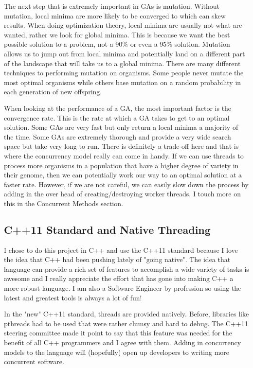 \documentclass{acm_proc_article-sp}
\begin{document}
The next step that is extremely important in GAs is mutation. Without mutation, local minima are more likely to be converged to which can skew results. When doing optimization theory, local minima are usually not what are wanted, rather we look for global minima. This is because we want the best possible solution to a problem, not a 90\% or even a 95\% solution. Mutation allows us to jump out from local minima and potentially land on a different part of the landscape that will take us to a global minima. There are many different techniques to performing mutation on organisms. Some people never mutate the most optimal organisms while others base mutation on a random probability in each generation of new offspring.

When looking at the performance of a GA, the most important factor is the convergence rate. This is the rate at which a GA takes to get to an optimal solution. Some GAs are very fast but only return a local minima a majority of the time. Some GAs are extremely thorough and provide a very wide search space but take very long to run. There is definitely a trade-off here and that is where the concurrency model really can come in handy. If we can use threads to process more organisms in a population that have a higher degree of variety in their genome, then we can potentially work our way to an optimal solution at a faster rate. However, if we are not careful, we can easily slow down the process by adding in the over head of creating/destroying worker threads. I touch more on this in the Concurrent Methods section.


\subsection{C++11 Standard and Native Threading}

I chose to do this project in C++ and use the C++11 standard because I love the idea that C++ had been pushing lately of "going native". The idea that language can provide a rich set of features to accomplish a wide variety of tasks is awesome and I really appreciate the effort that has gone into making C++ a more robust language. I am also a Software Engineer by profession so using the latest and greatest tools is always a lot of fun!

In the "new" C++11 standard, threads are provided natively. Before, libraries like pthreads had to be used that were rather clumsy and hard to debug. The C++11 steering committee made it point to say that this feature was needed for the benefit of all C++ programmers and I agree with them. Adding in concurrency models to the language will (hopefully) open up developers to writing more concurrent software.
\end{document}
